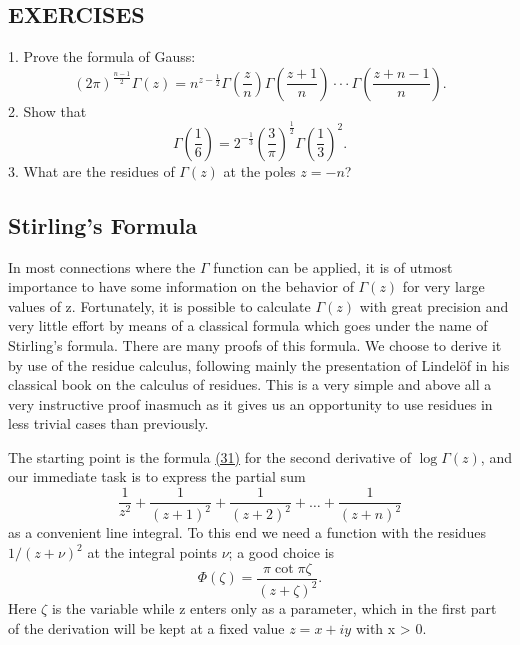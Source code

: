 \subsection*{EXERCISES}
1. Prove the formula of Gauss:
\begin{equation*}
(2 \pi) ^ {\frac {n - 1}{2}} \Gamma (z) = n ^ {z - \frac {1}{2}} \Gamma \left(\frac {z}{n}\right) \Gamma \left(\frac {z + 1}{n}\right) \cdot \cdot \cdot \Gamma \left(\frac {z + n - 1}{n}\right).
\end{equation*}
2. Show that
\begin{equation*}
\Gamma \left(\frac {1}{6}\right) = 2 ^ {- \frac {1}{3}} \left(\frac {3}{\pi}\right) ^ {\frac {1}{2}} \Gamma \left(\frac {1}{3}\right) ^ {2}.
\end{equation*}
3. What are the residues of $\Gamma(z)$ at the poles $z=-n$?


\setcounter{section}{2}\setcounter{subsection}{4}\subsection{Stirling's Formula}\label{sec:5.2.5}
In most connections where the $\Gamma$ function can be applied, it is of utmost importance to have some information on the behavior of $\Gamma(z)$ for very large values of z. Fortunately, it is possible to calculate $\Gamma(z)$ with great precision and very little effort by means of a classical formula which goes under the name of Stirling's formula. There are many proofs of this formula. We choose to derive it by use of the residue calculus, following mainly the presentation of Lindelöf in his classical book on the calculus of residues. This is a very simple and above all a very instructive proof inasmuch as it gives us an opportunity to use residues in less trivial cases than previously.

The starting point is the formula \hyperref[eq:5.31]{(31)} for the second derivative of $\log \Gamma(z)$, and our immediate task is to express the partial sum
\begin{equation*}
\frac {1}{z ^ {2}} + \frac {1}{(z + 1) ^ {2}} + \frac {1}{(z + 2) ^ {2}} + \dots + \frac {1}{(z + n) ^ {2}}
\end{equation*}
as a convenient line integral. To this end we need a function with the residues $1/(z + \nu)^{2}$ at the integral points $\nu$; a good choice is
\begin{equation*}
\Phi (\zeta) = \frac {\pi \cot \pi \zeta}{(z + \zeta) ^ {2}}.
\end{equation*}
Here $\zeta$ is the variable while z enters only as a parameter, which in the first part of the derivation will be kept at a fixed value $z = x + iy$ with x > 0.

